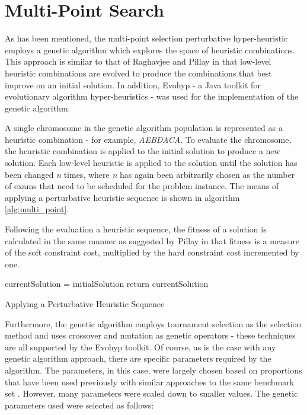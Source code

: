 \section{Multi-Point Search}\label{sec:multi_point}
As has been mentioned, the multi-point selection perturbative hyper-heuristic employs a genetic algorithm which explores the space of heuristic combinations. This approach is similar to that of Raghavjee and Pillay \cite{raghavjee2015genetic} in that low-level heuristic combinations are evolved to produce the combinations that best improve on an initial solution. In addition, Evohyp \cite{pillay2017evohyp} - a Java toolkit for evolutionary algorithm hyper-heuristics - was used for the implementation of the genetic algorithm.

A single chromosome in the genetic algorithm population is represented as a heuristic combination - for example, \emph{AEBDACA}. To evaluate the chromosome, the heuristic combination is applied to the initial solution to produce a new solution. Each low-level heuristic is applied to the solution until the solution has been changed \emph{n} times, where \emph{n} has again been arbitrarily chosen as the number of exams that need to be scheduled for the problem instance. The means of applying a perturbative heuristic sequence is shown in algorithm \ref{alg:multi_point}. 

Following the evaluation a heuristic sequence, the fitness of a solution is calculated in the same manner as suggested by Pillay \cite{pillay2010evolving} in that fitness is a measure of the soft constraint cost, multiplied by the hard constraint cost incremented by one.

\begin{algorithm}[H]\label{alg:multi_point}
\SetAlgoLined
 currentSolution = initialSolution\;
 \BlankLine
 \BlankLine
 return currentSolution\;
 \caption{Applying a Perturbative Heuristic Sequence}
\end{algorithm}

Furthermore, the genetic algorithm employs tournament selection as the selection method and uses crossover and mutation as genetic operators - these techniques are all supported by the Evohyp \cite{pillay2017evohyp} toolkit. Of course, as is the case with any genetic algorithm approach, there are specific parameters required by the algorithm. The parameters, in this case, were largely chosen based on proportions that have been used previously with similar approaches to the same benchmark set \cite{pillay2010evolving, raghavjee2015genetic}. However, many parameters were scaled down to smaller values. The genetic parameters used were selected as follows:

